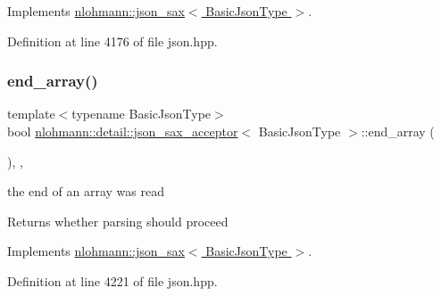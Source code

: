 Implements \hyperlink{structnlohmann_1_1json__sax_a82ed080814fa656191a537284bb0c575}{nlohmann\+::json\+\_\+sax$<$ Basic\+Json\+Type $>$}.



Definition at line 4176 of file json.\+hpp.

\mbox{\label{classnlohmann_1_1detail_1_1json__sax__acceptor_a32579cf8b5dda19a09810f4d6f9ff9af}} 
\subsubsection{\texorpdfstring{end\+\_\+array()}{end\_array()}}
{\footnotesize\ttfamily template$<$typename Basic\+Json\+Type$>$ \\
bool \hyperlink{classnlohmann_1_1detail_1_1json__sax__acceptor}{nlohmann\+::detail\+::json\+\_\+sax\+\_\+acceptor}$<$ Basic\+Json\+Type $>$\+::end\+\_\+array (\begin{DoxyParamCaption}{ }\end{DoxyParamCaption})\hspace{0.3cm}{\ttfamily [inline]}, {\ttfamily [override]}, {\ttfamily [virtual]}}



the end of an array was read 

\begin{DoxyReturn}{Returns}
whether parsing should proceed 
\end{DoxyReturn}


Implements \hyperlink{structnlohmann_1_1json__sax_a235ee975617f28e6a996d1e36a282312}{nlohmann\+::json\+\_\+sax$<$ Basic\+Json\+Type $>$}.



Definition at line 4221 of file json.\+hpp.

\mbox{\label{classnlohmann_1_1detail_1_1json__sax__acceptor_aec85a55e7febe5edef2235a55ce7b0bc}} 
